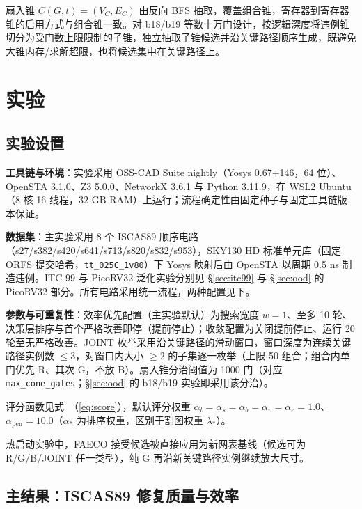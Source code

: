 \documentclass[journal]{IEEEtran}
\renewcommand{\eqref}[1]{\textup{（\ref{#1}）}}
\begin{document}
扇入锥 $C(G, t) = (V_C, E_C)$ 由反向 BFS 抽取，覆盖组合锥，寄存器到寄存器锥的启用方式与组合锥一致。对 b18/b19 等数十万门设计，按逻辑深度将违例锥切分为受门数上限限制的子锥，独立抽取子锥候选并沿关键路径顺序生成，既避免大锥内存/求解超限，也将候选集中在关键路径上。

\section{实验}\label{sec:exp}

\subsection{实验设置}\label{sec:setup}

\textbf{工具链与环境}：实验采用 OSS-CAD Suite nightly（Yosys 0.67+146，64 位）、OpenSTA 3.1.0、Z3 5.0.0、NetworkX 3.6.1 与 Python 3.11.9，在 WSL2 Ubuntu（8 核 16 线程，32 GB RAM）上运行；流程确定性由固定种子与固定工具链版本保证。

\textbf{数据集}：主实验采用 8 个 ISCAS89 顺序电路（s27/s382/s420/s641/s713/s820/s832/s953），SKY130 HD 标准单元库（固定 ORFS 提交哈希，\texttt{tt\_025C\_1v80}）下 Yosys 映射后由 OpenSTA 以周期 0.5 ns 制造违例。ITC-99 与 PicoRV32 泛化实验分别见 \S\ref{sec:itc99} 与 \S\ref{sec:ood} 的 PicoRV32 部分。所有电路采用统一流程，两种配置见下。

\textbf{参数与可重复性}：效率优先配置（主实验默认）为搜索宽度 $w=1$、至多 10 轮、决策层排序与首个严格改善即停（提前停止）；收敛配置为关闭提前停止、运行 20 轮至无严格改善。JOINT 枚举采用沿关键路径的滑动窗口，窗口深度为连续关键路径实例数 $\le 3$，对窗口内大小 $\ge 2$ 的子集逐一枚举（上限 50 组合；组合内单门优先 R、其次 G，不放 B）。扇入锥分治阈值为 1000 门（对应 \texttt{max\_cone\_gates}；\S\ref{sec:ood} 的 b18/b19 实验即采用该分治）。

评分函数见式~\eqref{eq:score}，默认评分权重 $\alpha_t=\alpha_s=\alpha_b=\alpha_v=\alpha_e=1.0$、$\alpha_{\mathrm{pen}}=10.0$（$\alpha_*$ 为排序权重，区别于割图权重 $\lambda_*$）。

热启动实验中，FAECO 接受候选被直接应用为新网表基线（候选可为 R/G/B/JOINT 任一类型），纯 G 再沿新关键路径实例继续放大尺寸。

\subsection{主结果：ISCAS89 修复质量与效率}\label{sec:iscas}
\end{document}
